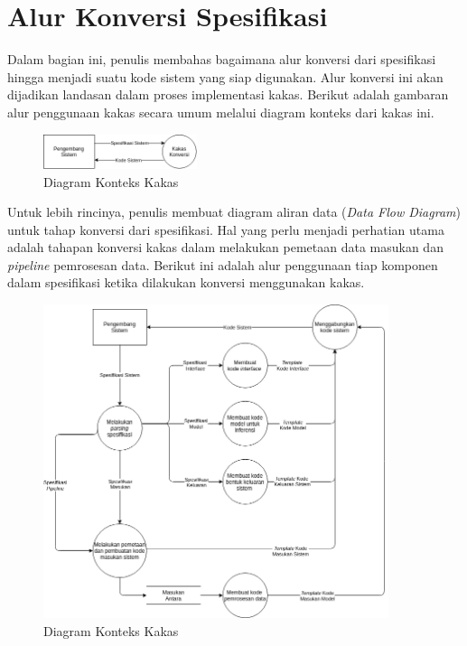 \section{Alur Konversi Spesifikasi}

Dalam bagian ini, penulis membahas bagaimana alur konversi dari spesifikasi hingga menjadi suatu kode sistem yang siap digunakan.
Alur konversi ini akan dijadikan landasan dalam proses implementasi kakas.
Berikut adalah gambaran alur penggunaan kakas secara umum melalui diagram konteks dari kakas ini.

\begin{figure}[H]
    \centering
    \includegraphics[width=0.4\textwidth]{resources/images/chapter-3/03-diagram-konteks.drawio.png}
    \caption{Diagram Konteks Kakas}
\end{figure}

Untuk lebih rincinya, penulis membuat diagram aliran data (\textit{Data Flow Diagram}) untuk tahap konversi dari spesifikasi.
Hal yang perlu menjadi perhatian utama adalah tahapan konversi kakas dalam melakukan pemetaan data masukan dan \textit{pipeline} pemrosesan data.
Berikut ini adalah alur penggunaan tiap komponen dalam spesifikasi ketika dilakukan konversi menggunakan kakas. 

\begin{figure}[H]
    \centering
    \includegraphics[width=0.9\textwidth]{resources/images/chapter-3/03-diagram-pembacaan-spesifikasi.drawio.png}
    \caption{Diagram Konteks Kakas}
\end{figure}